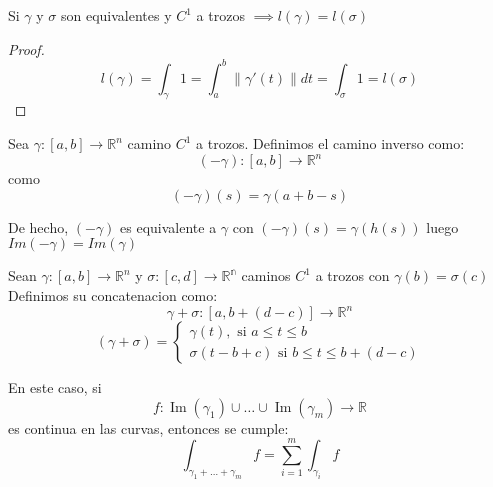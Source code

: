 \begin{corolario}
    Si $\gamma$ y $\sigma$ son equivalentes y $C^1$ a trozos $\implies l(\gamma)=l(\sigma)$
\end{corolario}

\begin{proof}
    $$l(\gamma) =\int_{\gamma}1=\int_{a}^{b} \lVert \gamma'(t) \rVert dt=\int_{\sigma}1=l(\sigma)$$
\end{proof}

\begin{definición}
Sea $\gamma:[a,b] \to \mathbb{R}^n$ camino $C^1$ a trozos. Definimos el camino inverso como: \\
$$(-\gamma):[a,b] \to \mathbb{R}^n$$ como $$ (-\gamma)(s)=\gamma(a+b-s)$$
\end{definición}

\begin{observación}
De hecho, $(-\gamma)$ es equivalente a $\gamma$ con $(-\gamma)(s)=\gamma(h(s))$ luego $Im(-\gamma)=Im(\gamma)$
\end{observación}

\begin{definición}
Sean $\gamma:[a,b] \to \mathbb{R}^n$ y $\sigma:[c,d] \to \mathbb{R^n}$ caminos $C^1$ a trozos con $\gamma(b)=\sigma(c)$\\
Definimos su concatenacion como:\\
$$\gamma + \sigma:[a,b+(d-c)] \to \mathbb{R}^n$$
$$(\gamma + \sigma) = \begin{cases}
        \gamma(t), \text{ si } a \leq t \leq b \\
        \sigma(t - b + c) \text{ si } b\leq t \leq b+(d-c)
    \end{cases}$$
\end{definición}

\begin{observación}
En este caso, si
\[
    f : \operatorname{Im}(\gamma_1) \cup \dots \cup \operatorname{Im}(\gamma_m) \longrightarrow \mathbb{R}
\]
es continua en las curvas, entonces se cumple:
\[
    \int_{\gamma_1 + \dots + \gamma_m} f = \sum_{i=1}^{m} \int_{\gamma_i} f
\]
\end{observación}

